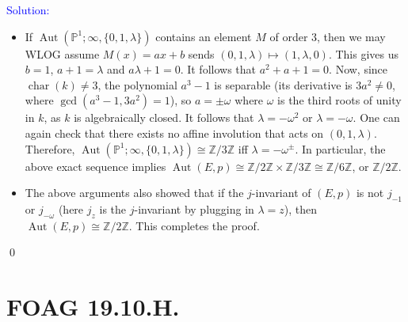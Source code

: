 \documentclass[11pt]{article}
\newcommand{\PP}{\mathbb{P}}
\newcommand{\ZZ}{\mathbb{Z}}
\newcommand{\Char}{\operatorname{char}}
\newcommand{\Aut}{\operatorname{Aut}}
\newenvironment{solution}{\begin{trivlist}\item[]{\textcolor{blue}{Solution:}}}{\qed \end{trivlist}}
\begin{document}
\begin{solution}
\begin{itemize}
		We will show that $\Aut(E, p) \cong \ZZ/4\ZZ$ by showing that it contains an element of order 4. The Weierstrass normal form of $E$ is given by $y^2 = x(x-1)(x+1) = x^3 - x$. The automorphism $(x, y) \mapsto (-x, iy)$ is then an order-4 automorphism of $(E, p)$. This completes the proof. 

		\item If $\Aut(\PP^1; \infty, \{0, 1, \lambda\})$ contains an element $M$ of order 3, then we may WLOG assume $M(x) = ax + b$ sends $(0, 1, \lambda) \mapsto (1, \lambda, 0)$. This gives us $b = 1$, $a + 1 = \lambda$ and $a \lambda + 1 = 0$. It follows that $a^2 + a + 1 = 0$. Now, since $\Char(k) \neq 3$, the polynomial $a^3 - 1$ is separable (its derivative is $3a^2 \neq 0$, where $\gcd(a^3 - 1, 3a^2) = 1$), so $a = \pm \omega$ where $\omega$ is the third roots of unity in $k$, as $k$ is algebraically closed. It follows that $\lambda = -\omega^2$ or $\lambda = -\omega$. One can again check that there exists no affine involution that acts on $(0, 1, \lambda)$. Therefore, $\Aut(\PP^1; \infty, \{0, 1, \lambda\}) \cong \ZZ/3\ZZ$ iff $\lambda = -\omega^{\pm}$. In particular, the above exact sequence implies $\Aut(E, p) \cong \ZZ/2\ZZ \times \ZZ/3\ZZ \cong \ZZ/6\ZZ$, or $\ZZ/2\ZZ$.
		
		\item The above arguments also showed that if the $j$-invariant of $(E, p)$ is not $j_{-1}$ or $j_{-\omega}$ (here $j_z$ is the $j$-invariant by plugging in $\lambda = z$), then $\Aut(E, p) \cong \ZZ/2\ZZ$. This completes the proof. 
	\end{itemize}
\end{solution}

\newpage

\section*{FOAG 19.10.H.}
\end{document}
